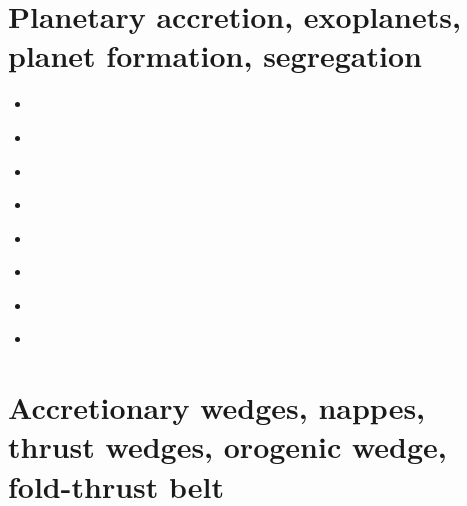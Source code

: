 \section{Planetary accretion, exoplanets, planet formation, segregation}

\begin{small}
\begin{itemize}
\item[\twothousandeight] 
\item[\twothousandnine] 
\\
\item[\twothousandten] 
\item[\twothousandeleven] 
\\
\item[\twothousandthirteen] 
\item[\twothousandfourteen] 
\\
\item[\twothousandnineteen] 
\\
\item[\twothousandtwenty] 
\end{itemize}
\end{small}

\section{Accretionary wedges, nappes, thrust wedges, orogenic wedge, fold-thrust belt} 

